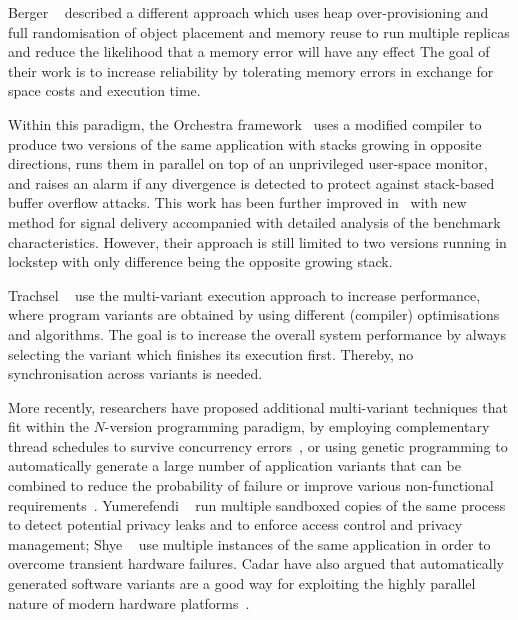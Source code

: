 Berger \etal~\cite{diehard06} described a different approach which uses heap
over-provisioning and full randomisation of object placement and memory reuse
to run multiple replicas and reduce the likelihood that a memory error will
have any effect
The goal of their work is to increase reliability by tolerating memory errors
in exchange for space costs and execution time.


Within this paradigm, the Orchestra framework~\cite{orchestra09} uses a
modified compiler to produce two versions of the same application with stacks
growing in opposite directions, runs them in parallel on top of an unprivileged
user-space monitor, and raises an alarm if any divergence is detected to
protect against stack-based buffer overflow attacks.  This work has been
further improved in~\cite{orchestra11} with new method for signal delivery
accompanied with detailed analysis of the benchmark characteristics. However,
their approach is still limited to two versions running in lockstep with only
difference being the opposite growing stack.

Trachsel \etal~\cite{trachsel10} use the multi-variant execution approach to
increase performance, where program variants are obtained by using different
(compiler) optimisations and algorithms.  The goal is to increase the overall
system performance by always selecting the variant which finishes its execution
first. Thereby, no synchronisation across variants is needed.

More recently, researchers have proposed additional multi-variant techniques
that fit within the $N$-version programming paradigm, \eg by employing
complementary thread schedules to survive concurrency
errors~\cite{compl-schedules11}, or using genetic programming to automatically
generate a large number of application variants that can be combined to reduce
the probability of failure or improve various non-functional
requirements~\cite{gismoe}. Yumerefendi \etal~\cite{tightlip} run multiple
sandboxed copies of the same process to detect potential privacy leaks and to
enforce access control and privacy management; Shye \etal~\cite{shye2009} use
multiple instances of the same application in order to overcome transient
hardware failures. Cadar \etal have also argued that automatically generated
software variants are a good way for exploiting the highly parallel nature of
modern hardware platforms~\cite{multiplicity}.

